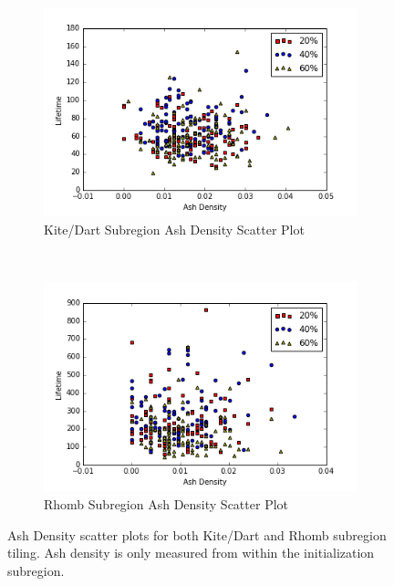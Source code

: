 \documentclass[a4paper,11pt]{report}
\begin{document}
\begin{figure}[htp]
\centering
	\begin{subfigure}[t]{0.6\textwidth}
	\includegraphics[width=\textwidth]{ch4_figs/ckdx_sub_ash_density}
	\caption{Kite/Dart Subregion Ash Density Scatter Plot}
	\label{fig:ckd_sub_ash_density}
	\end{subfigure}
~
	\begin{subfigure}[t]{0.6\textwidth}
	\centering
	\includegraphics[width=\textwidth]{ch4_figs/crhx_sub_ash_density}
	\caption{Rhomb Subregion Ash Density Scatter Plot}
	\label{fig:crh_sub_ash_density}
	\end{subfigure}
\caption[Subregion Ash Density Plots]{
	Ash Density scatter plots for both Kite/Dart and Rhomb subregion tiling. Ash density is only measured from within the initialization subregion.
	}
\end{figure}
\end{document}
